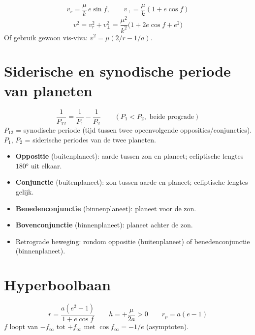 \documentclass[11pt, a4paper]{article}
\begin{document}
\begin{formule}
\[
  v_r = \frac{\mu}{k}\,e\sin f, \qquad v_\perp = \frac{\mu}{k}(1+e\cos f)
\]
\[
  v^2 = v_r^2 + v_\perp^2 = \frac{\mu^2}{k^2}\bigl(1 + 2e\cos f + e^2\bigr)
\]
Of gebruik gewoon vis-viva: $v^2 = \mu(2/r - 1/a)$.
\end{formule}

\section{Siderische en synodische periode van planeten}

\begin{formule}
\[
  \frac{1}{P_{12}} = \frac{1}{P_1} - \frac{1}{P_2}
  \qquad (P_1 < P_2, \text{ beide prograde})
\]
$P_{12}$ = synodische periode (tijd tussen twee opeenvolgende opposities/conjuncties).\\
$P_1$, $P_2$ = siderische periodes van de twee planeten.
\end{formule}

\begin{weetje}
\begin{itemize}[leftmargin=1.5em, itemsep=1pt]
  \item \textbf{Oppositie} (buitenplaneet): aarde tussen zon en planeet; ecliptische lengtes $180°$ uit elkaar.
  \item \textbf{Conjunctie} (buitenplaneet): zon tussen aarde en planeet; ecliptische lengtes gelijk.
  \item \textbf{Benedenconjunctie} (binnenplaneet): planeet voor de zon.
  \item \textbf{Bovenconjunctie} (binnenplaneet): planeet achter de zon.
  \item Retrograde beweging: rondom oppositie (buitenplaneet) of benedenconjunctie (binnenplaneet).
\end{itemize}
\end{weetje}

\section{Hyperboolbaan}

\begin{formule}[Hyperbool ($e > 1$, $h > 0$)]
\[
  r = \frac{a(e^2-1)}{1+e\cos f}
  \qquad
  h = +\frac{\mu}{2a} > 0
  \qquad
  r_p = a(e-1)
\]
$f$ loopt van $-f_\infty$ tot $+f_\infty$ met $\cos f_\infty = -1/e$ (asymptoten).
\end{formule}
\end{document}
